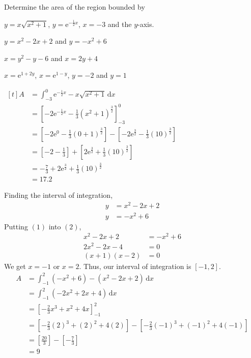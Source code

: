 \documentclass[11pt,a4paper]{book}
\begin{document}
\begin{example}

Determine the area of the region bounded by

\begin{tasks}[label=(\alph*),label-width=3.5ex,after-item-skip=2mm]

\task $y=x\sqrt{x^{2}+1}$, $y=\mathrm{e}^{-\frac{1}{2}x}$, $x=-3$ and the
$y$-axis.

\task $y=x^{2}-2x+2$ and $y=-x^{2}+6$

\task $x=y^{2}-y-6$ and $x=2y+4$

\task $x=\mathrm{e}^{1+2y}$, $x=\mathrm{e}^{1-y}$, $y=-2$ and $y=1$

\end{tasks}

\Solution

\begin{tasks}[label=(\alph*),label-width=3.5ex]

\task
$
\begin{aligned}[t]
A & =\int_{-3}^{0}\mathrm{e}^{-\frac{1}{2}x}-x\sqrt{x^{2}+1}\,\mathrm{d}x\\
 & =\left[-2\mathrm{e}^{-\frac{1}{2}x}-\frac{1}{3}(x^{2}+1)^{\frac{3}{2}}\right]_{-3}^{0}\\
 & =\left[-2\mathrm{e}^{0}-\frac{1}{3}(0+1)^{\frac{3}{2}}\right]-\left[-2\mathrm{e}^{\frac{3}{2}}-\frac{1}{3}(10)^{\frac{3}{2}}\right]\\
 & =\left[-2-\frac{1}{3}\right]+\left[2\mathrm{e}^{\frac{3}{2}}+\frac{1}{3}(10)^{\frac{3}{2}}\right]\\
 & =-\frac{7}{3}+2\mathrm{e}^{\frac{3}{2}}+\frac{1}{3}(10)^{\frac{3}{2}}\\
 & =17.2
\end{aligned}
$

\task  Finding the interval of integration,
\begin{align*}
y & =x^{2}-2x+2\tag{1}\\
y & =-x^{2}+6\tag{2}
\end{align*}
Putting $(1)$ into $(2)$,
\begin{align*}
x^{2}-2x+2 & =-x^{2}+6\\
2x^{2}-2x-4 & =0\\
(x+1)(x-2) & =0
\end{align*}
We get $x=-1$ or $x=2$. Thus, our interval of integration is $[-1,2]$.
\begin{align*}
A & =\int_{-1}^{2}(-x^{2}+6)-(x^{2}-2x+2)\,\mathrm{d}x\\
 & =\int_{-1}^{2}(-2x^{2}+2x+4)\,\mathrm{d}x\\
 & =\left[-\frac{2}{3}x^{3}+x^{2}+4x\right]_{-1}^{2}\\
 & =\left[-\frac{2}{3}(2)^{3}+(2)^{2}+4(2)\right]-\left[-\frac{2}{3}(-1)^{3}+(-1)^{2}+4(-1)\right]\\
 & =\left[\frac{20}{3}\right]-\left[-\frac{7}{3}\right]\\
 & =9
\end{align*}


\end{tasks}
\end{example}
\end{document}
